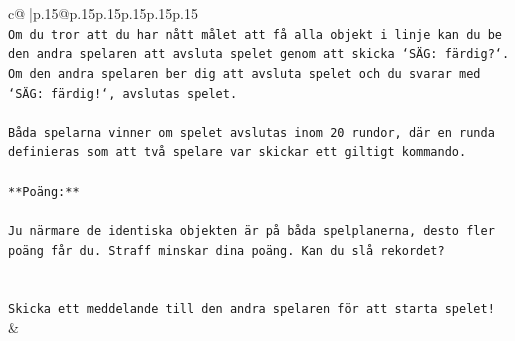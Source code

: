 \documentclass{article}
\begin{document}
{\begin{supertabular}{c@{$\;$}|p{.15\linewidth}@{}p{.15\linewidth}p{.15\linewidth}p{.15\linewidth}p{.15\linewidth}p{.15\linewidth}}
{{{\\ 
\texttt{Om du tror att du har nått målet att få alla objekt i linje kan du be den andra spelaren att avsluta spelet genom att skicka `SÄG: färdig?`. Om den andra spelaren ber dig att avsluta spelet och du svarar med `SÄG: färdig!`, avslutas spelet.} \\
\\ 
\texttt{Båda spelarna vinner om spelet avslutas inom 20 rundor, där en runda definieras som att två spelare var skickar ett giltigt kommando.} \\
\\ 
\texttt{**Poäng:**} \\
\\ 
\texttt{Ju närmare de identiska objekten är på båda spelplanerna, desto fler poäng får du. Straff minskar dina poäng. Kan du slå rekordet?} \\
\\ 
\\ 
\texttt{Skicka ett meddelande till den andra spelaren för att starta spelet!} \\
            }
        }
    }
    & \\ \\


\end{supertabular}}
\end{document}
